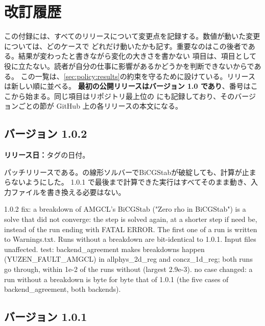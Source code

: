 \chapter{改訂履歴}
\label{ch:revisions}

この付録には、すべてのリリースについて変更点を記録する。数値が動いた変更については、どのケースで
どれだけ動いたかも記す。重要なのはこの後者である。結果が変わったと書きながら変化の大きさを書かない
項目は、項目として役に立たない。読者が自分の仕事に影響があるかどうかを判断できないからである。
この一覧は、\cref{sec:policy:results}の約束を守るために設けている。リリースは新しい順に並べる。
\textbf{最初の公開リリースはバージョン 1.0 であり}、番号はここから始まる。同じ項目はリポジトリ最上位の
にも記録しており、そのバージョンごとの節が GitHub 上の各リリースの本文になる。

\section{バージョン 1.0.2}
\label{sec:rev:1-0-2}

\textbf{リリース日：}タグの日付。

パッチリリースである。の線形ソルバーでBiCGStabが破綻しても、計算が止まらないようにした。
1.0.1 で最後まで計算できた実行はすべてそのまま動き、入力ファイルを書き換える必要はない。

\begin{plain}
1.0.2
  fix: a breakdown of AMGCL's BiCGStab ("Zero rho in BiCGStab") is a
       solve that did not converge: the step is solved again, at a
       shorter step if need be, instead of the run ending with FATAL
       ERROR. The first one of a run is written to Warnings.txt. Runs
       without a breakdown are bit-identical to 1.0.1. Input files
       unaffected.
  test: backend_agreement makes breakdowns happen (YUZEN_FAULT_AMGCL) in
       allphys_2d_reg and concz_1d_reg; both runs go through, within
       1e-2 of the runs without (largest 2.9e-3).
  no case changed: a run without a breakdown is byte for byte that of
       1.0.1 (the five cases of backend_agreement, both backends).
\end{plain}

\section{バージョン 1.0.1}
\label{sec:rev:1-0-1}

